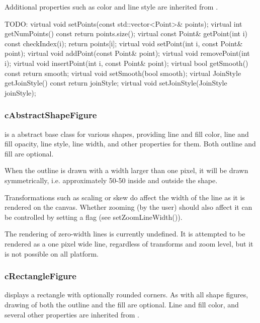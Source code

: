 Additional properties such as color and line style are inherited from
.

\begin{cpp} TODO:
        virtual void setPoints(const std::vector<Point>& points);
        virtual int getNumPoints() const {return points.size();}
        virtual const Point& getPoint(int i) const {checkIndex(i); return points[i];}
        virtual void setPoint(int i, const Point& point);
        virtual void addPoint(const Point& point);
        virtual void removePoint(int i);
        virtual void insertPoint(int i, const Point& point);
        virtual bool getSmooth() const {return smooth;}
        virtual void setSmooth(bool smooth);
        virtual JoinStyle getJoinStyle() const {return joinStyle;}
        virtual void setJoinStyle(JoinStyle joinStyle);
\end{cpp}

\subsubsection{cAbstractShapeFigure}

 is a abstract base class for various shapes,
providing line and fill color, line and fill opacity, line style, line
width, and other properties for them. Both outline and fill are optional.

When the outline is drawn with a width larger than one pixel, it will be
drawn symmetrically, i.e. approximately 50-50%
inside and outside the shape.

Transformations such as scaling or skew do affect the width of the line as it
is rendered on the canvas. Whether zooming (by the user) should also affect
it can be controlled by setting a flag (see setZoomLineWidth()).

The rendering of zero-width lines is currently undefined. It is attempted
to be rendered as a one pixel wide line, regardless of transforms and zoom
level, but it is not possible on all platform.

\subsubsection{cRectangleFigure}

 displays a rectangle with optionally rounded
corners. As with all shape figures, drawing of both the outline and the
fill are optional. Line and fill color, and several other properties are
inherited from .

